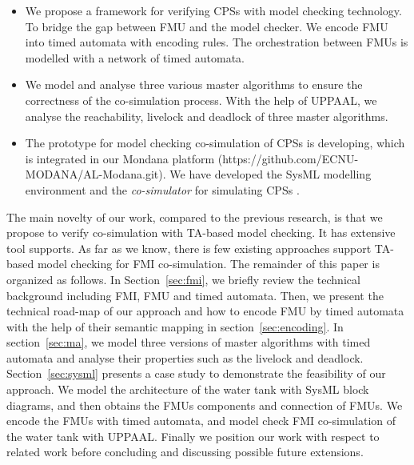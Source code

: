 \begin{itemize}
\item
We propose a framework for verifying CPSs with model checking technology. To bridge the gap between FMU and the model checker. We encode FMU into timed automata with encoding rules. The orchestration between FMUs is modelled with a network of timed automata. 
\item
We model and analyse three various master algorithms to ensure the correctness of the co-simulation process. With the help of UPPAAL, we analyse the reachability, livelock and deadlock of three master algorithms.
\item
The prototype for model checking co-simulation of CPSs is developing, which is integrated in our Mondana platform \cite{Cheng2015Modana}(https://github.com/ECNU-MODANA/AL-Modana.git). We have developed the SysML modelling environment and the \textit{co-simulator} for simulating CPSs \cite{Fritzson1998Modelica}.
\end{itemize}
The main novelty of our work, compared to the previous research, is that we propose to verify co-simulation with TA-based model checking. It has extensive tool supports. As far as we know, there is few existing approaches support TA-based model checking for FMI co-simulation.
The remainder of this paper is organized as follows. In Section~\ref{sec:fmi}, we briefly review the technical background including FMI, FMU and timed automata. Then, we present the technical road-map of our approach and how to encode FMU by timed automata with the help of their semantic mapping in section~\ref{sec:encoding}.
In section~\ref{sec:ma}, we model three versions of master algorithms with timed automata and analyse their properties such as the livelock and deadlock.
Section~\ref{sec:sysml} presents a case study to demonstrate the feasibility of our approach. We model the architecture of the water tank with SysML block diagrams, and then obtains the FMUs components and connection of FMUs. We encode the FMUs with timed automata, and model check FMI co-simulation of the water tank with UPPAAL. Finally we position our work with respect to related work before concluding and discussing possible future extensions.




















